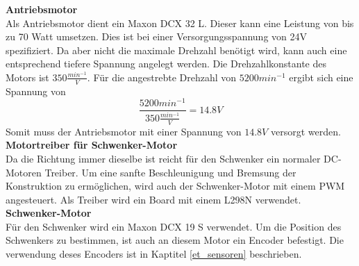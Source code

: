 \documentclass[../../main.tex]{subfiles}
\begin{document}
    \textbf{Antriebsmotor}\\
    Als Antriebsmotor dient ein Maxon DCX 32 L. Dieser kann eine Leistung von bis zu 70 Watt umsetzen. \cite{MaxonDCX32L} Dies ist bei einer Versorgungsspannung von 24V spezifiziert. Da aber nicht die maximale Drehzahl benötigt wird, kann auch eine entsprechend tiefere Spannung angelegt werden. Die Drehzahlkonstante des Motors ist $350 \frac{min^{-1}}{V}$. Für die angestrebte Drehzahl von $5200min^{-1}$ ergibt sich eine Spannung von $$\frac{5200min^{-1}}{350 \frac{min^{-1}}{V}} =14.8V$$ Somit muss der Antriebsmotor mit einer Spannung von $14.8V$ versorgt werden.\\

    \textbf{Motortreiber für Schwenker-Motor}\\
    Da die Richtung immer dieselbe ist reicht für den Schwenker ein normaler DC-Motoren Treiber. Um eine sanfte Beschleunigung und Bremsung der Konstruktion zu ermöglichen, wird auch der Schwenker-Motor mit einem PWM angesteuert. Als Treiber wird ein Board mit einem L298N verwendet.\\

    \textbf{Schwenker-Motor}\\
    Für den Schwenker wird ein Maxon DCX 19 S verwendet. Um die Position des Schwenkers zu bestimmen, ist auch an diesem Motor ein Encoder befestigt. Die verwendung deses Encoders ist in Kaptitel \ref{et_sensoren} beschrieben. \cite{MaxonDCX19S}\\

    
\end{document}
